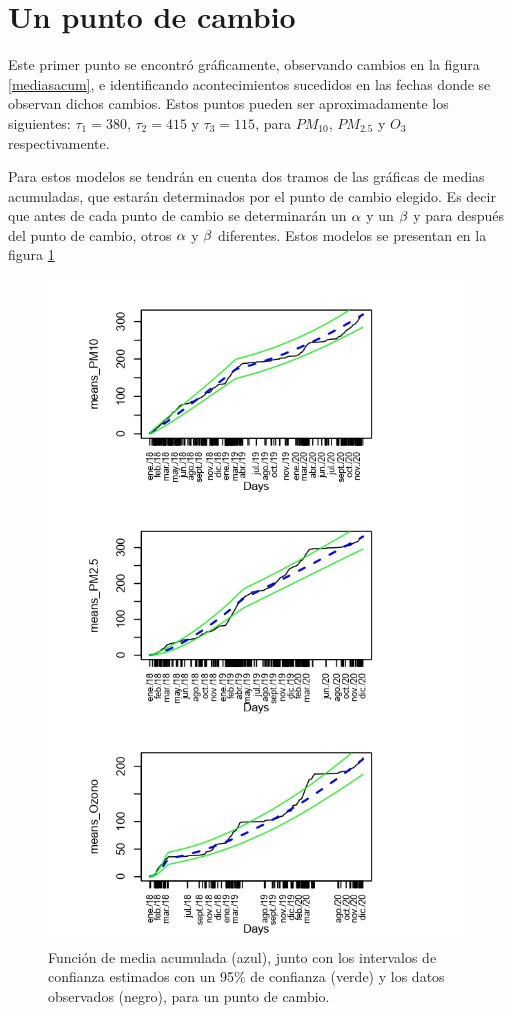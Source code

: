\newpage


\section{Un punto de cambio}
 

Este primer punto se encontró gráficamente, observando cambios en la figura \ref{mediasacum}, e identificando acontecimientos sucedidos en las fechas donde se observan dichos cambios. Estos puntos pueden ser aproximadamente los siguientes: 
$\tau_1=380$, $\tau_2=415$ y $\tau_3=115$, para $PM_{10}$, $PM_{2.5}$ y $O_3$ respectivamente.  



Para estos modelos se tendrán en cuenta dos tramos de las gráficas de medias acumuladas, que estarán determinados por el punto de cambio elegido. Es decir que antes de cada punto de cambio se determinarán un $\alpha$ y un $\beta$ y para después del punto de cambio, otros $\alpha$ y $\beta$ diferentes. Estos modelos se presentan en la figura \ref{mediasacumupc}

\begin{figure}[h!]
\begin{center}
\includegraphics[width=11cm]{MEANSUPC}
\end{center}
\centering
\caption{ Función de media acumulada (azul), junto con los intervalos de confianza estimados con un 95\% de confianza (verde) y los datos observados (negro), para un punto de cambio.  }
\label{mediasacumupc}
\end{figure}


